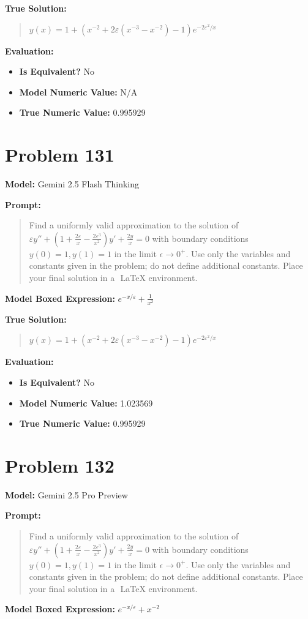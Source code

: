 \documentclass{article}
\begin{document}
{\textbf{True Solution:}
\begin{quote}
$y(x) = 1 + \left( x^{-2} + 2\varepsilon(x^{-3} - x^{-2}) - 1 \right) e^{-2\varepsilon^2 / x}$
\end{quote}

\textbf{Evaluation:}
\begin{itemize}
\item \textbf{Is Equivalent?} No
\item \textbf{Model Numeric Value:} N/A
\item \textbf{True Numeric Value:} 0.995929
\end{itemize}
\vspace{1cm}
\section*{Problem 131}
\textbf{Model:} Gemini 2.5 Flash Thinking

\textbf{Prompt:}
\begin{quote}
Find a uniformly valid approximation to the solution of $ \varepsilon y'' + \left(1 + \frac{2\varepsilon}{x} - \frac{2\varepsilon^3}{x^2}\right) y' + \frac{2y}{x} = 0 $ with boundary conditions $y(0)=1, y(1)=1$ in the limit $\epsilon \to 0^+$. Use only the variables and constants given in the problem; do not define additional constants. Place your final solution in a $\boxed{}$ LaTeX environment.
\end{quote}
\textbf{Model Boxed Expression:} $e^{-x/\varepsilon} + \frac{1}{x^2}$

\textbf{True Solution:}
\begin{quote}
$y(x) = 1 + \left( x^{-2} + 2\varepsilon(x^{-3} - x^{-2}) - 1 \right) e^{-2\varepsilon^2 / x}$
\end{quote}

\textbf{Evaluation:}
\begin{itemize}
\item \textbf{Is Equivalent?} No
\item \textbf{Model Numeric Value:} 1.023569
\item \textbf{True Numeric Value:} 0.995929
\end{itemize}
\vspace{1cm}
\section*{Problem 132}
\textbf{Model:} Gemini 2.5 Pro Preview

\textbf{Prompt:}
\begin{quote}
Find a uniformly valid approximation to the solution of $ \varepsilon y'' + \left(1 + \frac{2\varepsilon}{x} - \frac{2\varepsilon^3}{x^2}\right) y' + \frac{2y}{x} = 0 $ with boundary conditions $y(0)=1, y(1)=1$ in the limit $\epsilon \to 0^+$. Use only the variables and constants given in the problem; do not define additional constants. Place your final solution in a $\boxed{}$ LaTeX environment.
\end{quote}
\textbf{Model Boxed Expression:} $e^{-x/\varepsilon} + x^{-2}$

}
\end{document}
